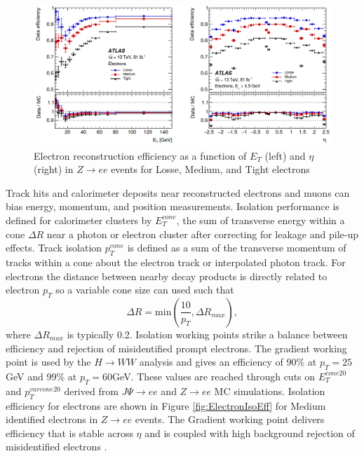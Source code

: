 \begin{figure}[!h]
        \centering
    \includegraphics[width=.75\textwidth]{Pictures/ElectroEff.png}
    \caption{ Electron reconstruction efficiency as a function of $E_T$ (left) and $\eta$ (right) in $Z\rightarrow ee$ events for Losse, Medium, and Tight electrons \cite{ElectronPhotonPerformance}}
    \label{fig:ElectronEff}
\end{figure}

Track hits and calorimeter deposits near reconstructed electrons and muons can bias energy, momentum, and position measurements. Isolation performance is defined for calorimeter clusters by $E_T^{cone}$, the sum of transverse energy within a cone $\Delta R$ near a photon or electron cluster after correcting for leakage and pile-up effects. Track isolation $p_T^{cone}$ is defined as a sum of the transverse momentum of tracks within a cone about the electron track or interpolated photon track. For electrons the distance between nearby decay products is directly related to electron $p_T$ so a variable cone size can used such that 
\begin{equation}
\Delta R = \text{min}(\frac{10}{p_T},\Delta R_{max}),
\end{equation}
where $\Delta R_{max}$ is typically 0.2. Isolation working points strike a balance between efficiency and rejection of misidentified prompt electrons. The gradient working point is used by the $H\rightarrow WW$ analysis and gives an efficiency of 90\% at $p_T = 25$GeV and 99\% at $p_T = 60$GeV. These values are reached through cuts on $E_T^{cone20}$ and $p_T^{varcone20}$ derived from $J\Psi\rightarrow ee$ and $Z\rightarrow ee$ MC simulations. Isolation efficiency for electrons are shown in Figure \ref{fig:ElectronIsoEff} for Medium identified electrons in $Z\rightarrow ee$ events. The Gradient working point delivers efficiency that is stable across $\eta$ and is coupled with high background rejection of misidentified electrons \cite{ElectronPhotonPerformance}.  

